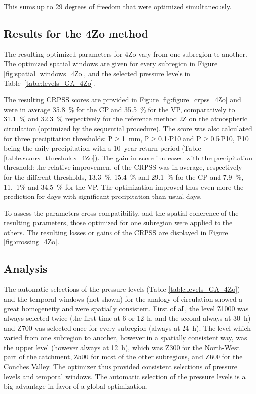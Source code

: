 \documentclass[review]{elsarticle}
\begin{document}
This sums up to 29 degrees of freedom that were optimized simultaneously.


\subsection{Results for the 4Zo method}

The resulting optimized parameters for 4Zo vary from one subregion to another. The optimized spatial windows are given for every subregion in Figure \ref{fig:spatial_windows_4Zo}, and the selected pressure levels in Table~\ref{table:levels_GA_4Zo}. 

The resulting CRPSS scores are provided in Figure \ref{fig:figure_crpss_4Zo} and were in average 35.8~\% for the CP and 35.5~\% for the VP, comparatively to 31.1~\% and 32.3~\% respectively for the reference method 2Z on the atmospheric circulation (optimized by the sequential procedure). The score was also calculated for three precipitation thresholds: P\(\geq\)1~mm, P\(\geq\)0.1\(\cdot\)P10 and P\(\geq\)0.5\(\cdot\)P10, P10 being the daily precipitation with a 10~year return period (Table \ref{table:scores_thresholds_4Zo}). The gain in score increased with the precipitation threshold: the relative improvement of the CRPSS was in average, respectively for the different thresholds, 13.3~\%, 15.4~\% and 29.1~\% for the CP and 7.9~\%, 11.~1\% and 34.5~\% for the VP. The optimization improved thus even more the prediction for days with significant precipitation than usual days.

To assess the parameters cross-compatibility, and the spatial coherence of the resulting parameters, those optimized for one subregion were applied to the others. The resulting losses or gains of the CRPSS are displayed in Figure \ref{fig:crossing_4Zo}.


\subsection{Analysis}

The automatic selections of the pressure levels (Table \ref{table:levels_GA_4Zo}) and the temporal windows (not shown) for the analogy of circulation showed a great homogeneity and were spatially consistent. First of all, the level Z1000 was always selected twice (the first time at 6 or 12~h, and the second always at 30~h) and Z700 was selected once for every subregion (always at 24~h). The level which varied from one subregion to another, however in a spatially consistent way, was the upper level (however always at 12~h), which was Z300 for the North-West part of the catchment, Z500 for most of the other subregions, and Z600 for the Conches Valley. The optimizer thus provided consistent selections of pressure levels and temporal windows. The automatic selection of the pressure levels is a big advantage in favor of a global optimization.
\end{document}

